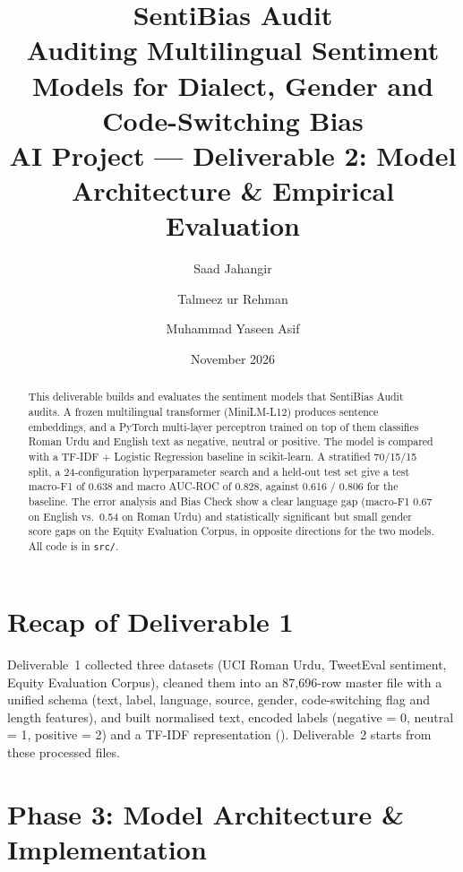 \documentclass[11pt,a4paper]{article}
\title{\textbf{SentiBias Audit}\\[4pt]
\large Auditing Multilingual Sentiment Models for Dialect, Gender and Code-Switching Bias\\[6pt]
\normalsize AI Project --- Deliverable 2: Model Architecture \& Empirical Evaluation}
\author{Saad Jahangir \and Talmeez ur Rehman \and Muhammad Yaseen Asif}
\date{November 2026}
\begin{document}
\maketitle

\begin{abstract}
This deliverable builds and evaluates the sentiment models that SentiBias Audit audits.
A frozen multilingual transformer (MiniLM-L12) produces sentence embeddings, and a PyTorch
multi-layer perceptron trained on top of them classifies Roman Urdu and English text as
negative, neutral or positive. The model is compared with a TF-IDF + Logistic Regression
baseline in scikit-learn. A stratified 70/15/15 split, a 24-configuration hyperparameter search
and a held-out test set give a test macro-F1 of 0.638 and macro AUC-ROC of 0.828, against 0.616 / 0.806 for the
baseline. The error analysis and Bias Check show a clear language gap (macro-F1 0.67 on
English vs.\ 0.54 on Roman Urdu) and statistically significant but small gender score gaps on
the Equity Evaluation Corpus, in opposite directions for the two models. All code is in
\texttt{src/}.
\end{abstract}

\section{Recap of Deliverable 1}
Deliverable~1 collected three datasets (UCI Roman Urdu, TweetEval sentiment, Equity Evaluation
Corpus), cleaned them into an 87,696-row master file with a unified schema (text, label,
language, source, gender, code-switching flag and length features), and built normalised text, encoded labels (negative = 0, neutral = 1, positive = 2) and a TF-IDF
representation (). Deliverable~2 starts from these processed files.

\section{Phase 3: Model Architecture \& Implementation}
\end{document}

